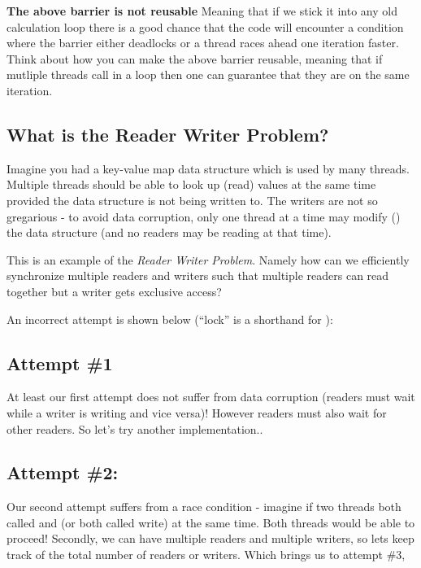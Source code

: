 \textbf{The above barrier is not reusable} Meaning that if we stick it into any old calculation loop there is a good chance that the code will encounter a condition where the barrier either deadlocks or a thread races ahead one iteration faster. Think about how you can make the above barrier reusable, meaning that if mutliple threads call  in a loop then one can guarantee that they are on the same iteration.

\subsection{What is the Reader Writer Problem?}\label{what-is-the-reader-writer-problem}

Imagine you had a key-value map data structure which is used by many threads. Multiple threads should be able to look up (read) values at the same time provided the data structure is not being written to. The writers are not so gregarious - to avoid data corruption, only one thread at a time may modify () the data structure (and no readers may be reading at that time).

This is an example of the \emph{Reader Writer Problem}. Namely how can we efficiently synchronize multiple readers and writers such that multiple readers can read together but a writer gets exclusive access?

An incorrect attempt is shown below (``lock'' is a shorthand for ):

\subsection{Attempt \#1}\label{attempt-1}

At least our first attempt does not suffer from data corruption (readers must wait while a writer is writing and vice versa)! However readers must also wait for other readers. So let's try another implementation..

\subsection{Attempt \#2:}\label{attempt-2}

Our second attempt suffers from a race condition - imagine if two threads both called  and  (or both called write) at the same time. Both threads would be able to proceed! Secondly, we can have multiple readers and multiple writers, so lets keep track of the total number of readers or writers. Which brings us to attempt \#3,

